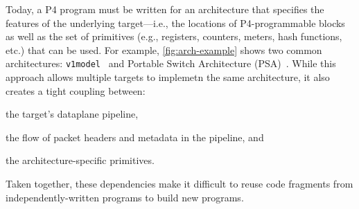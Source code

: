 \documentclass[letterpaper,twocolumn,10pt]{article}
\begin{document}

Today, a P4 program must be written for an architecture that specifies
the features of the underlying target---i.e., the locations of
P4-programmable blocks as well as the set of primitives (e.g.,
registers, counters, meters, hash functions, etc.) that can be used.
For example, \cref{fig:arch-example} shows two common architectures:
\texttt{v1model}~\cite{v1model.p4} and Portable Switch Architecture
(PSA)~\cite{psa}. While this approach allows multiple targets to
implemetn the same architecture, it also creates a tight coupling
between:
\begin{enumerate*}[label=(\roman*)]
  \item the target's dataplane pipeline,
  \item the flow of packet headers and metadata in the pipeline, and
  \item the architecture-specific primitives.
\end{enumerate*}
Taken together, these dependencies make it difficult to reuse code
fragments from independently-written programs to build new programs.

\end{document}
